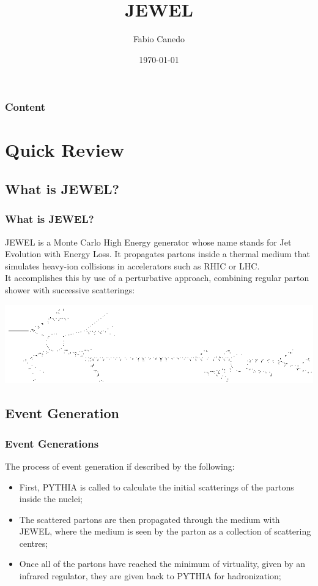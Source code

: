 \documentclass{beamer}
\title[JEWEL]{JEWEL}
\institute[HEPIC-Instituto de Física]{HEPIC-Instituto de Física}
\author{Fabio Canedo}
\date{\today}
\newcommand*\titleTOC{Content}
\begin{document}
{
\usebackgroundtemplate{}%
\frame{\titlepage}
}

{
\begin{frame}\frametitle{\titleTOC}
	\tableofcontents
\end{frame}
}

\section{Quick Review}
\subsection{What is JEWEL?}

\begin{frame}\frametitle{What is JEWEL?}
        JEWEL is a Monte Carlo High Energy generator whose name stands for
        Jet Evolution with Energy Loss. It propagates partons inside a
        thermal medium that simulates heavy-ion collisions in accelerators
        such as RHIC or LHC.
        \\
        \pause
        It accomplishes this by use of a perturbative approach, combining regular parton shower
        with successive scatterings:
        \begin{minipage}{1.0\textwidth}
		\includegraphics[scale=0.5]{images/feynman.png}        
        \end{minipage}
\end{frame}

\subsection{Event Generation}
\begin{frame}\frametitle{Event Generations}
	The process of event generation if described by the following:
	\begin{itemize}
	\pause
	\item First, PYTHIA is called to calculate the initial scatterings of the partons inside the
	nuclei;
	\pause
	\item The scattered partons are then propagated through the medium with JEWEL, where the medium
	is seen by the parton as a collection of scattering centres;
	\pause
	\item Once all of the partons have reached the minimum of virtuality, given by an infrared
	regulator, they are given back to PYTHIA for hadronization;
	\end{itemize}
\end{frame}
\end{document}
